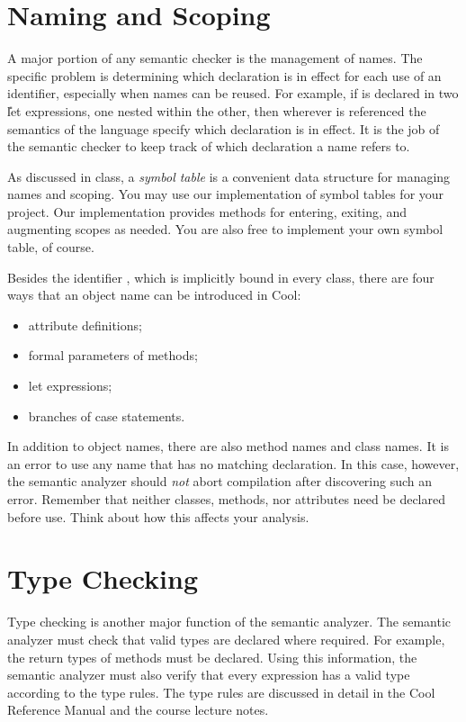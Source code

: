 \documentclass[11pt]{article}
\begin{document}
\section{Naming and Scoping}

A major portion of any semantic checker is the management of names.  The
specific problem is determining which declaration is in effect for each
use of an identifier, especially when names can be reused. For example,
if  is declared in two \U{let} expressions, one nested within the
other, then wherever  is referenced the semantics of the language
specify which declaration is in effect.  It is the job of the semantic
checker to keep track of which declaration a name refers to.

As discussed in class, a {\em symbol table} is a convenient data
structure for managing names and scoping.  You may use our
implementation of symbol tables for your project.  Our implementation
provides methods for entering, exiting, and augmenting scopes as needed.
You are also free to implement your own symbol table, of course.

Besides the identifier , which is implicitly bound in every
class, there are four ways that an object name can be introduced in
Cool:
\begin{itemize}
\item attribute definitions;
\item formal parameters of methods;
\item let expressions;
\item branches of case statements.
\end{itemize}

In addition to object names, there are also method names and class
names.  It is an error to use any name that has no matching
declaration.  In this case, however, the semantic analyzer should
{\em not} abort compilation after discovering such an error.
Remember that neither classes, methods, nor attributes need be declared
before use.  Think about how this affects your analysis.

\section{Type Checking}

Type checking is another major function of the semantic analyzer.  The
semantic analyzer must check that valid types are declared where
required.  For example, the return types of methods must be declared.
Using this information, the semantic analyzer must also verify that
every expression has a valid type according to the type rules.  The
type rules are discussed in detail in the Cool Reference Manual and
the course lecture notes.
\end{document}
